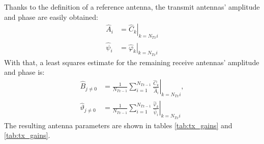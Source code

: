 Thanks to the definition of a reference antenna,
the transmit antennas' amplitude and phase are easily obtained:
\begin{align}
    \hat A_i    & = \left.\hat C_k \right|_{k=N_{Tx}i}       \\
    \hat \psi_i & = \left.\hat \varphi_k \right|_{k=N_{Tx}i}
\end{align}
With that, a least squares estimate for the remaining receive antennas' amplitude and phase is:
\begin{align}
    \hat B_{j\neq0}         & = \frac{1}{N_{Tx-1}} \sum_{i=1}^{N_{Tx-1}} \left. \frac{\hat C_k}{\hat A_i} \right|_{k=N_{Tx}i},         \\
    \hat \vartheta_{j\neq0} & = \frac{1}{N_{Tx-1}} \sum_{i=1}^{N_{Tx-1}} \left. \frac{\hat \varphi_k}{\hat \psi_i} \right|_{k=N_{Tx}i}
\end{align}
The resulting antenna parameters are shown in tables \ref{tab:tx_gains} and \ref{tab:tx_gains}.
